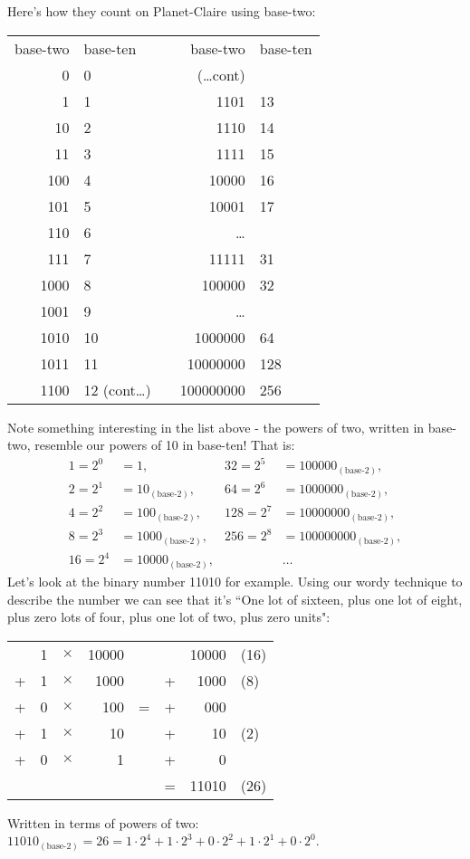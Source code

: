 \documentclass{article}
\begin{document}
Here's how they count on Planet-Claire using base-two:
\begin{center}
\begin{tabular}{r l c r l}
base-two & base-ten & \; \; \; \; & base-two & base-ten\\
0 & 0 & \phantom& (\dots cont)\\
1 & 1 & \phantom& 1101 & 13\\
10 & 2 & \phantom& 1110 & 14\\
11 & 3 & \phantom& 1111 & 15\\
100 & 4 & \phantom& 10000 & 16\\
101 & 5 & \phantom& 10001 & 17\\
110 & 6 & \phantom& \dots{}\\
111 & 7 & \phantom& 11111 & 31\\
1000 & 8 & \phantom& 100000 & 32\\
1001 & 9 & \phantom& \dots{}\\
1010 & 10 & \phantom & 1000000 & 64\\
1011 & 11 & \phantom& 10000000 & 128\\
1100 & 12 (cont\dots) & \phantom& 100000000 & 256
\end{tabular}
\end{center}
Note something interesting in the list above - the powers of two,
written in base-two,
resemble our powers of 10 in base-ten! That is:
\begin{align*}
1 = 2^0&= 1, & 32 = 2^5&= 100000_{(\text{base-2})},\\
2 = 2^1&= 10_{(\text{base-2})}, & 64 = 2^6&= 1000000_{(\text{base-2})},\\
4 = 2^2&= 100_{(\text{base-2})}, & 128 = 2^7&= 10000000_{(\text{base-2})},\\
8 = 2^3&= 1000_{(\text{base-2})},& 256 = 2^8&= 100000000_{(\text{base-2})},\\
16 = 2^4&= 10000_{(\text{base-2})},& & \dots{}
\end{align*}
Let's look at the binary number 11010 for example.
Using our wordy technique to describe the number
we can see that it's ``One lot of sixteen,
plus one lot of eight, plus zero lots of four,
plus one lot of two, plus zero units": 
\begin{center}
\begin{tabular}{r r r r c r r l}
\phantom & 1 & $\times$ & 10000 & \phantom & \phantom & 10000 & (16)\\
+ & 1 & $\times$ & 1000 & \phantom & + & 1000 & (8)\\
+ & 0 & $\times$ & 100 & \; \; = \; \; & + & 000 & \\
+ & 1 & $\times$ & 10 & \phantom & + & 10 & (2)\\
+ & 0 & $\times$ & 1 & \phantom & + & 0\\
\cline{6-8}
\phantom & \phantom & \phantom & \phantom & \phantom & = & 11010 & (26)\\
\end{tabular}
\end{center}
Written in terms of powers of two:
$11010_{(\text{base-2})}=26=1\cdot2^4+1\cdot2^3+0\cdot2^2+1\cdot2^1+0\cdot2^0$.
\end{document}
